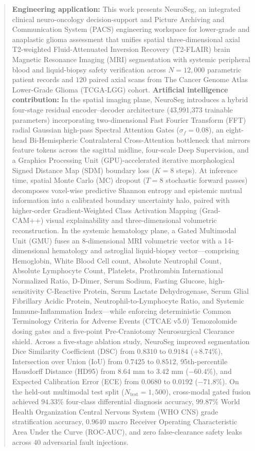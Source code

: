 \documentclass[journal,onecolumn,10pt]{IEEEtran}
\begin{document}
\begin{abstract}
\textbf{Engineering application:} This work presents NeuroSeg, an integrated clinical neuro-oncology decision-support and Picture Archiving and Communication System (PACS) engineering workspace for lower-grade and anaplastic glioma assessment that unifies spatial three-dimensional axial T2-weighted Fluid-Attenuated Inversion Recovery (T2-FLAIR) brain Magnetic Resonance Imaging (MRI) segmentation with systemic peripheral blood and liquid-biopsy safety verification across $N = 12,000$ parametric patient records and $120$ paired axial scans from The Cancer Genome Atlas Lower-Grade Glioma (TCGA-LGG) cohort. \textbf{Artificial intelligence contribution:} In the spatial imaging plane, NeuroSeg introduces a hybrid four-stage residual encoder--decoder architecture (43,991,373 trainable parameters) incorporating two-dimensional Fast Fourier Transform (FFT) radial Gaussian high-pass Spectral Attention Gates ($\sigma_f = 0.08$), an eight-head Bi-Hemispheric Contralateral Cross-Attention bottleneck that mirrors feature tokens across the sagittal midline, four-scale Deep Supervision, and a Graphics Processing Unit (GPU)-accelerated iterative morphological Signed Distance Map (SDM) boundary loss ($K = 8$ steps). At inference time, spatial Monte Carlo (MC) dropout ($T = 8$ stochastic forward passes) decomposes voxel-wise predictive Shannon entropy and epistemic mutual information into a calibrated boundary uncertainty halo, paired with higher-order Gradient-Weighted Class Activation Mapping (Grad-CAM++) visual explainability and three-dimensional volumetric reconstruction. In the systemic hematology plane, a Gated Multimodal Unit (GMU) fuses an 8-dimensional MRI volumetric vector with a 14-dimensional hematology and astroglial liquid-biopsy vector---comprising Hemoglobin, White Blood Cell count, Absolute Neutrophil Count, Absolute Lymphocyte Count, Platelets, Prothrombin International Normalized Ratio, D-Dimer, Serum Sodium, Fasting Glucose, high-sensitivity C-Reactive Protein, Serum Lactate Dehydrogenase, Serum Glial Fibrillary Acidic Protein, Neutrophil-to-Lymphocyte Ratio, and Systemic Immune-Inflammation Index---while enforcing deterministic Common Terminology Criteria for Adverse Events (CTCAE v5.0) Temozolomide dosing gates and a five-point Pre-Craniotomy Neurosurgical Clearance shield. Across a five-stage ablation study, NeuroSeg improved segmentation Dice Similarity Coefficient (DSC) from $0.8310$ to $0.9184$ ($+8.74\%$), Intersection over Union (IoU) from $0.7425$ to $0.8512$, 95th-percentile Hausdorff Distance (HD95) from $8.64\text{ mm}$ to $3.42\text{ mm}$ ($-60.4\%$), and Expected Calibration Error (ECE) from $0.0680$ to $0.0192$ ($-71.8\%$). On the held-out multimodal test split ($N_{\text{test}} = 1,500$), cross-modal gated fusion achieved $94.33\%$ four-class differential diagnosis accuracy, $99.87\%$ World Health Organization Central Nervous System (WHO CNS) grade stratification accuracy, $0.9640$ macro Receiver Operating Characteristic Area Under the Curve (ROC-AUC), and zero false-clearance safety leaks across $40$ adversarial fault injections.
\end{abstract}
\end{document}
